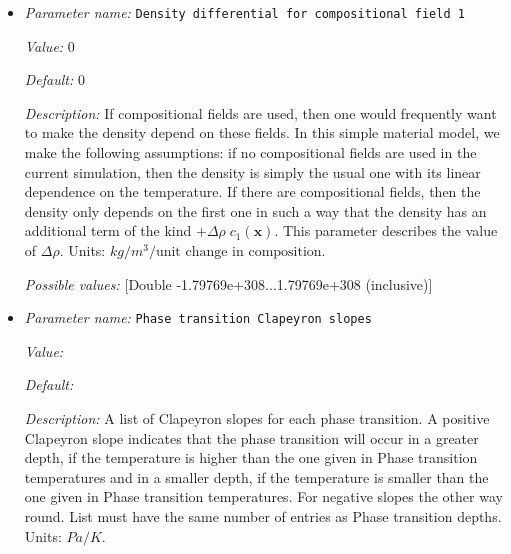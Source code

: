 \begin{itemize}
{\it Description:} A list of phases, which correspond to the Phase transition density jumps. The density jumps occur only in the phase that is given by this phase value. 0 stands for the 1st compositional fields, 1 for the second compositional field and -1 for none of them. List must have the same number of entries as Phase transition depths. Units: $Pa/K$.


{\it Possible values:} [List list of <[Integer range 0...2147483647 (inclusive)]> of length 0...4294967295 (inclusive)]
\item {\it Parameter name:} {\tt Density differential for compositional field 1}


{\it Value:} 0


{\it Default:} 0


{\it Description:} If compositional fields are used, then one would frequently want to make the density depend on these fields. In this simple material model, we make the following assumptions: if no compositional fields are used in the current simulation, then the density is simply the usual one with its linear dependence on the temperature. If there are compositional fields, then the density only depends on the first one in such a way that the density has an additional term of the kind $+\Delta \rho \; c_1(\mathbf x)$. This parameter describes the value of $\Delta \rho$. Units: $kg/m^3/\textrm{unit change in composition}$.


{\it Possible values:} [Double -1.79769e+308...1.79769e+308 (inclusive)]
\item {\it Parameter name:} {\tt Phase transition Clapeyron slopes}


{\it Value:} 


{\it Default:} 


{\it Description:} A list of Clapeyron slopes for each phase transition. A positive Clapeyron slope indicates that the phase transition will occur in a greater depth, if the temperature is higher than the one given in Phase transition temperatures and in a smaller depth, if the temperature is smaller than the one given in Phase transition temperatures. For negative slopes the other way round. List must have the same number of entries as Phase transition depths. Units: $Pa/K$.



\end{itemize}
